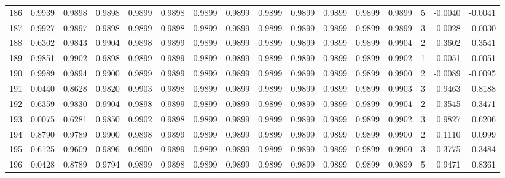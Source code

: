 \begin{tabular}{lrrrrrrrrrrrrrrr}
186 &      0.9939 &  0.9898 &  0.9898 &  0.9899 &  0.9898 &  0.9899 &  0.9899 &  0.9899 &  0.9899 &  0.9899 &   0.9899 &     0.9899 &      5 &                   -0.0040 &                    -0.0041 \\
187 &      0.9927 &  0.9897 &  0.9898 &  0.9899 &  0.9898 &  0.9899 &  0.9899 &  0.9899 &  0.9899 &  0.9899 &   0.9899 &     0.9899 &      3 &                   -0.0028 &                    -0.0030 \\
188 &      0.6302 &  0.9843 &  0.9904 &  0.9898 &  0.9899 &  0.9899 &  0.9899 &  0.9899 &  0.9899 &  0.9899 &   0.9899 &     0.9904 &      2 &                    0.3602 &                     0.3541 \\
189 &      0.9851 &  0.9902 &  0.9898 &  0.9899 &  0.9899 &  0.9899 &  0.9899 &  0.9899 &  0.9899 &  0.9899 &   0.9899 &     0.9902 &      1 &                    0.0051 &                     0.0051 \\
190 &      0.9989 &  0.9894 &  0.9900 &  0.9899 &  0.9899 &  0.9899 &  0.9899 &  0.9899 &  0.9899 &  0.9899 &   0.9899 &     0.9900 &      2 &                   -0.0089 &                    -0.0095 \\
191 &      0.0440 &  0.8628 &  0.9820 &  0.9903 &  0.9898 &  0.9899 &  0.9899 &  0.9899 &  0.9899 &  0.9899 &   0.9899 &     0.9903 &      3 &                    0.9463 &                     0.8188 \\
192 &      0.6359 &  0.9830 &  0.9904 &  0.9898 &  0.9899 &  0.9899 &  0.9899 &  0.9899 &  0.9899 &  0.9899 &   0.9899 &     0.9904 &      2 &                    0.3545 &                     0.3471 \\
193 &      0.0075 &  0.6281 &  0.9850 &  0.9902 &  0.9898 &  0.9899 &  0.9899 &  0.9899 &  0.9899 &  0.9899 &   0.9899 &     0.9902 &      3 &                    0.9827 &                     0.6206 \\
194 &      0.8790 &  0.9789 &  0.9900 &  0.9898 &  0.9899 &  0.9899 &  0.9899 &  0.9899 &  0.9899 &  0.9899 &   0.9899 &     0.9900 &      2 &                    0.1110 &                     0.0999 \\
195 &      0.6125 &  0.9609 &  0.9896 &  0.9900 &  0.9899 &  0.9899 &  0.9899 &  0.9899 &  0.9899 &  0.9899 &   0.9899 &     0.9900 &      3 &                    0.3775 &                     0.3484 \\
196 &      0.0428 &  0.8789 &  0.9794 &  0.9899 &  0.9898 &  0.9899 &  0.9899 &  0.9899 &  0.9899 &  0.9899 &   0.9899 &     0.9899 &      5 &                    0.9471 &                     0.8361 \\

\end{tabular}
